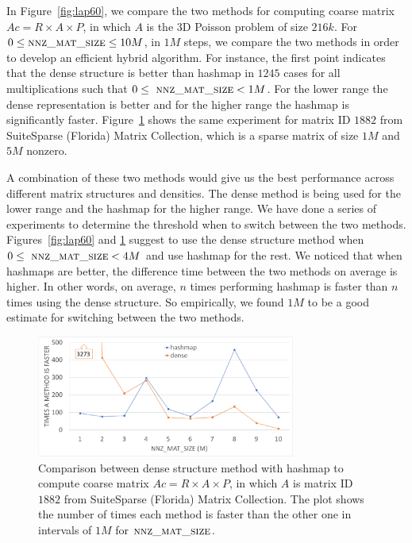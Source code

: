 In Figure~\ref{fig:lap60}, we compare the two methods for computing coarse matrix $Ac = R \times A \times P$, in which $A$ is the 3D Poisson problem of size $216k$. For $0 \leq \textsc{nnz\_mat\_size} \leq 10M$, in $1M$ steps, we compare the two methods in order to develop an efficient hybrid algorithm. For instance, the first point indicates that the dense structure is better than hashmap in $1245$ cases for all multiplications such that $0 \le\ \textsc{nnz\_mat\_size} < 1M$. For the lower range the dense representation is better and for the higher range the hashmap is significantly faster. Figure~\ref{fig:eco} shows the same experiment for matrix ID $1882$ from SuiteSparse (Florida) Matrix Collection, which is a sparse matrix of size $1M$ and $5M$ nonzero.

A combination of these two methods would give us the best performance across different matrix structures and densities. The dense method is being used for the lower range and the hashmap for the higher range.
We have done a series of experiments to determine the threshold when to switch between the two methods. Figures~\ref{fig:lap60} and \ref{fig:eco} suggest to use the dense structure method when $0 \le\ \textsc{nnz\_mat\_size} < 4M$ and use hashmap for the rest. We noticed that when hashmaps are better, the difference time between the two methods on average is higher. In other words, on average, $n$ times performing hashmap is faster than $n$ times using the dense structure. So empirically, we found $1M$ to be a good estimate for switching between the two methods.

\begin{figure}[tbh]
 \centering
 \includegraphics[width=8.5cm,height=4cm]{./figures/eco_range.pdf}
 \caption{Comparison between dense structure method with hashmap to compute coarse matrix $Ac = R \times A \times P$, in which $A$ is matrix ID $1882$ from SuiteSparse (Florida) Matrix Collection. The plot shows the number of times each method is faster than the other one in intervals of $1M$ for $\textsc{nnz\_mat\_size}$.}
 \label{fig:eco}
 \Description{}
\end{figure}

